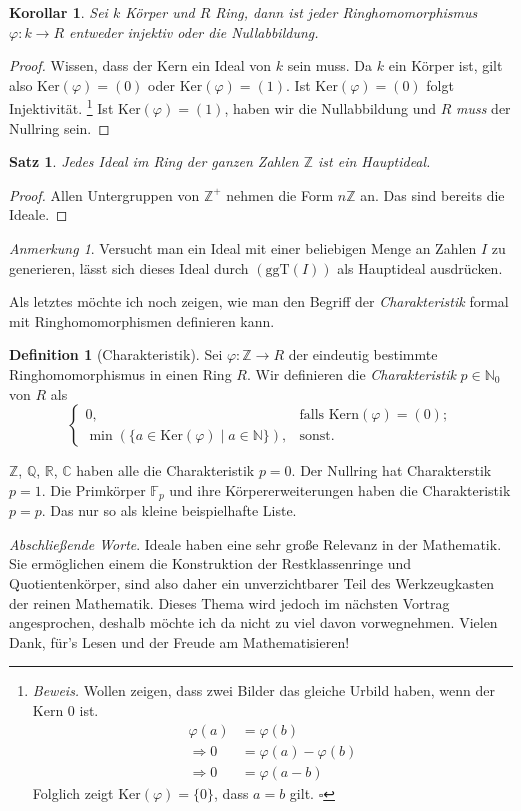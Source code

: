 \documentclass{article}
\newtheorem*{satz}{Satz}
\newtheorem*{cor}{Korollar}
\theoremstyle{definition}
\newtheorem*{definition}{Definition}
\theoremstyle{remark}
\newtheorem*{anm}{Anmerkung}
\begin{document}
\begin{cor}
Sei $k$ Körper und $R$ Ring, dann ist jeder Ringhomomorphismus $\varphi:k\to R$ entweder injektiv oder die
Nullabbildung.
\end{cor}
\begin{proof}
Wissen, dass der Kern ein Ideal von $k$ sein muss. Da $k$ ein Körper ist, gilt also $\mathrm{Ker}(\varphi)=(0)$
oder $\mathrm{Ker}(\varphi)=(1)$. Ist $\mathrm{Ker}(\varphi)=(0)$ folgt Injektivität.
\footnote{\textit{Beweis.}
Wollen zeigen, dass zwei Bilder das gleiche Urbild haben, wenn der Kern $0$ ist.
\begin{align*}
\varphi(a) &= \varphi(b) \\
\Rightarrow 0 &= \varphi(a)-\varphi(b) \\
\Rightarrow 0 &= \varphi(a-b)
\end{align*}
Folglich zeigt $\mathrm{Ker}(\varphi)=\{0\}$, dass $a=b$ gilt. \hfill$\square$
}
Ist $\mathrm{Ker}(\varphi)=(1)$, haben wir die Nullabbildung und $R$ \emph{muss} der Nullring sein.
\end{proof}


\begin{satz}
Jedes Ideal im Ring der ganzen Zahlen $\mathbb Z$ ist ein Hauptideal.
\end{satz}
\begin{proof}
Allen Untergruppen von $\mathbb Z^+$ nehmen die Form $n\mathbb Z$ an. Das sind bereits die Ideale.
\end{proof}

\begin{anm}
Versucht man ein Ideal mit einer beliebigen Menge an Zahlen $I$ zu generieren, lässt sich dieses Ideal durch
$(\mathrm{ggT}(I))$ als Hauptideal ausdrücken.
\end{anm}

Als letztes möchte ich noch zeigen, wie man den Begriff der \emph{Charakteristik} formal mit Ringhomomorphismen
definieren kann.

\begin{definition}[Charakteristik]
Sei $\varphi: \mathbb Z\to R$ der eindeutig bestimmte Ringhomomorphismus in einen Ring $R$. Wir definieren die
\emph{Charakteristik} $p\in\mathbb N_0$ von $R$ als
\[\begin{cases}
    0, &\text{falls Kern}(\varphi)=(0); \\
    \min\left(\{a\in \mathrm{Ker}(\varphi) \mid a\in\mathbb N\}\right), &\text{sonst.}
\end{cases}\]
\end{definition}
$\mathbb Z$, $\mathbb Q$, $\mathbb R$, $\mathbb C$ haben alle die Charakteristik $p=0$.
Der Nullring hat Charakterstik $p=1$. Die Primkörper $\mathbb F_{p}$ und ihre Körpererweiterungen haben
die Charakteristik $p=p$. Das nur so als kleine beispielhafte Liste.

\vspace{3em}
\emph{Abschließende Worte}.
Ideale haben eine sehr große Relevanz in der Mathematik. Sie ermöglichen einem die Konstruktion der
Restklassenringe und Quotientenkörper, sind also daher ein unverzichtbarer Teil des
Werkzeugkasten der reinen Mathematik. Dieses Thema wird jedoch im nächsten Vortrag angesprochen, deshalb
möchte ich da nicht zu viel davon vorwegnehmen. Vielen Dank, für's Lesen und der Freude am Mathematisieren!
\end{document}
